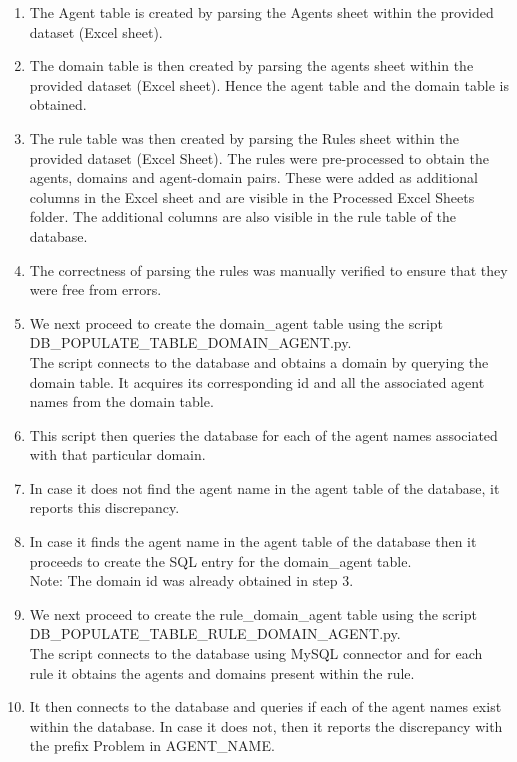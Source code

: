 \documentclass[msc,deptreport,ai]{infthesis}      %
\begin{document}
\begin{enumerate}
	\item The Agent table is created by parsing the Agents sheet within the provided dataset (Excel sheet).
	\item The domain table is then created by parsing the agents sheet within the provided dataset (Excel sheet). Hence the agent table and the domain table is obtained.
	\item The rule table was then created by parsing the Rules sheet within the provided dataset (Excel Sheet). The rules were pre-processed to obtain the agents, domains and agent-domain pairs. These were added as additional columns in the Excel sheet and are visible in the Processed Excel Sheets folder. The additional columns are also visible in the rule table of the database.
	\item The correctness of parsing the rules was manually verified to ensure that they were free from errors. 
	\item We next proceed to create the domain\_agent table using the script\\ DB\_POPULATE\_TABLE\_DOMAIN\_AGENT.py.\\ The script connects to the database and obtains a domain by querying the domain table. It acquires its corresponding id and all the associated agent names from the domain table. 
	\item This script then queries the database for each of the agent names associated with that particular domain. 
	\item In case it does not find the agent name in the agent table of the database, it reports this discrepancy.
	\item In case it finds the agent name in the agent table of the database then it proceeds to create the SQL entry for the domain\_agent table.\\ Note: The domain id was already obtained in step 3. 
	\item We next proceed to create the rule\_domain\_agent table using the script\\ DB\_POPULATE\_TABLE\_RULE\_DOMAIN\_AGENT.py.\\ The script connects to the database using MySQL connector and for each rule it obtains the agents and domains present within the rule.
	\item  It then connects to the database and queries if each of the agent names exist within the database. In case it does not, then it reports the discrepancy with the prefix Problem in AGENT\_NAME. 

\end{enumerate}
\end{document}
